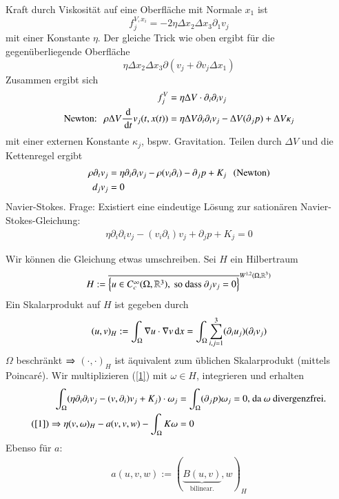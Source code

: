 \begin{description}
Kraft durch Viskosität auf eine Oberfläche mit Normale $x_1$ ist 
\[
    f_j^{V,x_i}= -2\eta \Delta x_2\Delta x_3 \partial_1v_j
\]
mit einer Konstante $\eta$. Der gleiche Trick wie oben ergibt für die gegenüberliegende
Oberfläche
\[
    \eta \Delta x_2 \Delta x_3 \partial (v_j+\partial v_j\Delta x_1)
\]
Zusammen ergibt sich
\begin{align*}
    f_j^V&= \eta\Delta V \cdot \partial_i\partial_iv_j\\
    \text{Newton:} \hspace{.25cm} \rho \Delta V \frac{\, \mathrm{d}}{\, \mathrm{d} t} v_j (t,x(t))
        &= \eta \Delta V  \partial _i\partial_iv_j- \Delta V (\partial _j p) + \Delta 
        V\kappa_j 
\end{align*}
mit einer externen Konstante $\kappa_j$, bspw. Gravitation.
Teilen durch $\Delta V$ und die Kettenregel ergibt
\begin{align*}
    \rho \partial_t v_j&= \eta \partial_i\partial_i v_j - \rho (v_i\partial_i) - \partial_j p + K_j 
        \hspace{.25cm} \text{(Newton)}\\
    d_jv_j&=0
\end{align*}
Navier-Stokes. Frage: Existiert eine eindeutige Lösung zur sationären Navier-Stokes-Gleichung:
\begin{align}\label{1}
    \eta \partial_i\partial_iv_j-(v_i\partial_i)v_j+\partial_jp+K_j=0
\end{align}
\end{description}
Wir können die Gleichung etwas umschreiben. Sei $H$ ein Hilbertraum
\[
    H:=\overline{\left\{ u\in C^\infty_c (\Omega,\mathbb{R}^3), \text{ so dass } \partial_jv_j=0 \right\}}
        ^{W^{1,2}(\Omega, \mathbb{R}^3)}
\]
Ein Skalarprodukt auf $H$ ist gegeben durch
\begin{align*}
    (u,v)_H:= \int_{\Omega} \nabla u\cdot \nabla v \, \mathrm{d} x = \int_\Omega \sum_{i,j=1}^3 
    (\partial_iu_j)(\partial_iv_j)
\end{align*}
$\Omega$ beschränkt $\Rightarrow$ $(\cdot, \cdot)_H$ ist äquivalent zum üblichen Skalarprodukt 
(mittels Poincaré).
Wir multiplizieren (\ref{1}) mit $\omega \in H $, integrieren und erhalten
\begin{align*}
    \int_\Omega (\eta \partial_i\partial_i v_j- (v,\partial_i) v_j + K_j) \cdot \omega_j 
    &= \int_\Omega (\partial _jp)\omega_j=0 \text{, da $\omega$ divergenzfrei.}\\
    (\ref{1}) \Rightarrow \eta (v,\omega)_H-a(v,v,w)-\int_\Omega K\omega&=0
\end{align*}
Ebenso für $a$:
\begin{align*}
    a(u,v,w):= (\underbrace{B(u,v)}_{\text{bilinear.}},w)_H
\end{align*}
